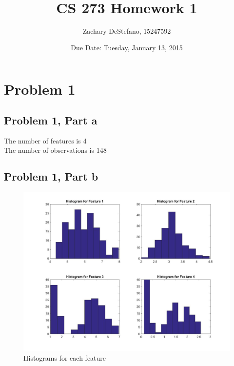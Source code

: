 \documentclass[11pt,psfig]{article}
\begin{document}
\setlength{\parskip}{1.2ex plus0.3ex minus 0.3ex}


\thispagestyle{empty} \pagestyle{myheadings} 



\title{CS 273 Homework 1}
\author{Zachary DeStefano, 15247592}
\date{Due Date: Tuesday, January 13, 2015}

\maketitle

\vfill\eject


\section*{Problem 1}

\subsection*{Problem 1, Part a}

The number of features is 4\\
The number of observations is 148\\

\subsection*{Problem 1, Part b}

\begin{figure}[H]
\centering
\includegraphics[width=\columnwidth]{prob1bHistograms.jpg}
\caption{Histograms for each feature}
\end{figure}
\end{document}
